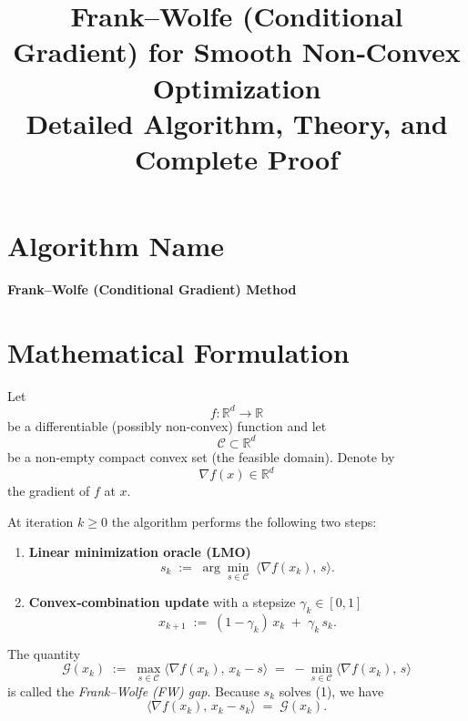 \documentclass[11pt]{article}
\begin{document}
\title{Frank–Wolfe (Conditional Gradient) for Smooth Non‑Convex Optimization \\ Detailed Algorithm, Theory, and Complete Proof}
\author{}
\date{}
\maketitle

\tableofcontents
\newpage

\section*{Algorithm Name}
\begin{center}
\Large \textbf{Frank–Wolfe (Conditional Gradient) Method}
\end{center}

\section{Mathematical Formulation}
\label{sec:formulation}
Let 
\[
f:\mathbb{R}^{d}\rightarrow\mathbb{R}
\]
be a differentiable (possibly non‑convex) function and let 
\[
\mathcal C\subset\mathbb{R}^{d}
\]
be a non‑empty compact convex set (the feasible domain).  
Denote by 
\[
\nabla f(x) \in\mathbb{R}^{d}
\]
the gradient of $f$ at $x$.  

At iteration $k\ge 0$ the algorithm performs the following two steps:

\begin{enumerate}
    \item \textbf{Linear minimization oracle (LMO)}  
    \[
    s_{k}\;:=\;\arg\min_{s\in\mathcal C}\;\langle \nabla f(x_{k}),\,s\rangle .
    \tag{1}
    \]
    \item \textbf{Convex‑combination update} with a stepsize $\gamma_{k}\in[0,1]$  
    \[
    x_{k+1}\;:=\;(1-\gamma_{k})\,x_{k}\;+\;\gamma_{k}\,s_{k}.
    \tag{2}
    \]
\end{enumerate}

The quantity
\[
\mathcal G(x_{k})\;:=\;\max_{s\in\mathcal C}\langle \nabla f(x_{k}),\,x_{k}-s\rangle
    \;=\;-\min_{s\in\mathcal C}\langle \nabla f(x_{k}),\,s\rangle
\tag{3}
\]
is called the \emph{Frank–Wolfe (FW) gap}. Because $s_{k}$ solves (1), we have
\[
\langle \nabla f(x_{k}),\,x_{k}-s_{k}\rangle \;=\;\mathcal G(x_{k}).
\tag{4}
\]
\end{document}
